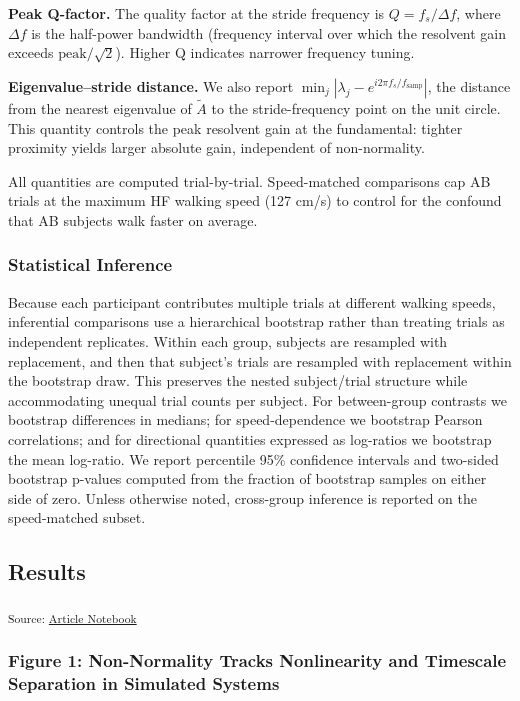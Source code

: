 \documentclass[
  letterpaper,
  DIV=11,
  numbers=noendperiod]{scrartcl}
\begin{document}
\textbf{Peak Q-factor.} The quality factor at the stride frequency is
\(Q = f_s / \Delta f\), where \(\Delta f\) is the half-power bandwidth
(frequency interval over which the resolvent gain exceeds
\(\text{peak} / \sqrt{2}\)). Higher Q indicates narrower frequency
tuning.

\textbf{Eigenvalue--stride distance.} We also report
\(\min_j |\lambda_j - e^{i 2\pi f_s / f_{\text{samp}}}|\), the distance
from the nearest eigenvalue of \(\tilde{A}\) to the stride-frequency
point on the unit circle. This quantity controls the peak resolvent gain
at the fundamental: tighter proximity yields larger absolute gain,
independent of non-normality.

All quantities are computed trial-by-trial. Speed-matched comparisons
cap AB trials at the maximum HF walking speed (127 cm/s) to control for
the confound that AB subjects walk faster on average.

\subsubsection{Statistical Inference}\label{statistical-inference}

Because each participant contributes multiple trials at different
walking speeds, inferential comparisons use a hierarchical bootstrap
rather than treating trials as independent replicates. Within each
group, subjects are resampled with replacement, and then that subject's
trials are resampled with replacement within the bootstrap draw. This
preserves the nested subject/trial structure while accommodating unequal
trial counts per subject. For between-group contrasts we bootstrap
differences in medians; for speed-dependence we bootstrap Pearson
correlations; and for directional quantities expressed as log-ratios we
bootstrap the mean log-ratio. We report percentile 95\% confidence
intervals and two-sided bootstrap p-values computed from the fraction of
bootstrap samples on either side of zero. Unless otherwise noted,
cross-group inference is reported on the speed-matched subset.

\subsection{Results}\label{results}

\textsubscript{Source:
\href{https://michaelhess17.github.io/Gait_NonNormality_Paper/index.qmd.html}{Article
Notebook}}

\subsubsection{Figure 1: Non-Normality Tracks Nonlinearity and Timescale
Separation in Simulated
Systems}\label{figure-1-non-normality-tracks-nonlinearity-and-timescale-separation-in-simulated-systems}
\end{document}

